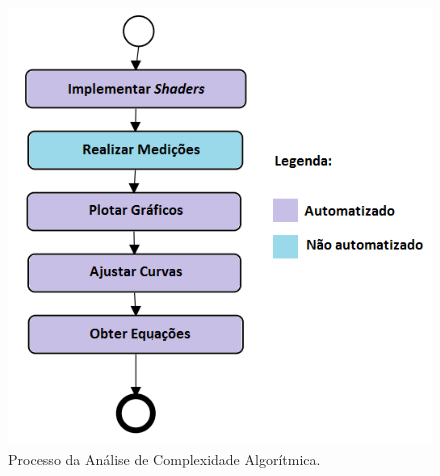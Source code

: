 	\begin{figure}[ht]
	\centering
		\includegraphics[keepaspectratio=true,scale=0.5]{figuras/processo.png}
	\caption{Processo da Análise de Complexidade Algorítmica.}
	\label{processo}
	\end{figure}

